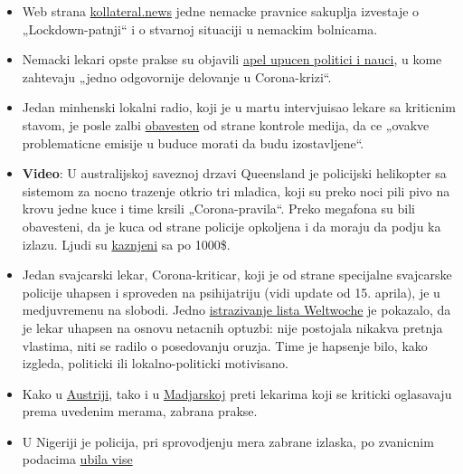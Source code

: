 \begin{itemize}
\tightlist
\item
  Web strana \href{https://kollateral.news/}{kollateral.news} jedne
  nemacke pravnice sakuplja izvestaje o „Lockdown-patnji`` i o stvarnoj
  situaciji u nemackim bolnicama.
\item
  Nemacki lekari opste prakse su objavili
  \href{https://aerzteinnenvorort.de/der-appell}{apel upucen politici i
  nauci}, u kome zahtevaju „jedno odgovornije delovanje u
  Corona-krizi``.
\item
  Jedan minhenski lokalni radio, koji je u martu intervjuisao lekare sa
  kriticnim stavom, je posle zalbi
  \href{https://norberthaering.de/medienversagen/radiomuenchen-blm-meinungsvielfalt/}{obavesten}
  od strane kontrole medija, da ce „ovakve problematicne emisije u
  buduce morati da budu izostavljene``.
\item
  \textbf{Video}: U australijskoj saveznoj drzavi Queensland je
  policijski helikopter sa sistemom za nocno trazenje otkrio tri
  mladica, koji su preko noci pili pivo na krovu jedne kuce i time
  krsili „Corona-pravila``. Preko megafona su bili obavesteni, da je
  kuca od strane policije opkoljena i da moraju da podju ka izlazu.
  Ljudi su
  \href{https://www.dailystar.co.uk/news/world-news/police-helicopter-uses-night-vision-21899640}{kaznjeni}
  sa po 1000\$.
\item
  Jedan svajcarski lekar, Corona-kriticar, koji je od strane specijalne
  svajcarske policije uhapsen i sproveden na psihijatriju (vidi update
  od 15. aprila), je u medjuvremenu na slobodi. Jedno
  \href{https://uncut-news.ch/wp-content/uploads/2020/04/Wer-löste-den-Fehlalarm-aus.pdf}{istrazivanje
  lista Weltwoche} je pokazalo, da je lekar uhapsen na osnovu netacnih
  optuzbi: nije postojala nikakva pretnja vlastima, niti se radilo o
  posedovanju oruzja. Time je hapsenje bilo, kako izgleda, politicki ili
  lokalno-politicki motivisano.
\item
  Kako u
  \href{https://www.sn.at/panorama/oesterreich/arzt-droht-berufsverbot-wegen-kritik-an-corona-massnahmen-86594140}{Austriji},
  tako i u
  \href{https://magyarhang.org/belfold/2020/04/16/etikai-vizsgalat-indul-az-orvos-ellen-aki-szerint-nincs-jarvany-es-az-idosek-csak-a-felelemtol-halnak-meg/}{Madjarskoj}
  preti lekarima koji se kriticki oglasavaju prema uvedenim merama,
  zabrana prakse.
\item
  U Nigeriji je policija, pri sprovodjenju mera zabrane izlaska, po
  zvanicnim podacima
  \href{https://www.bbc.com/news/world-africa-52317196}{ubila vise
}
\end{itemize}
